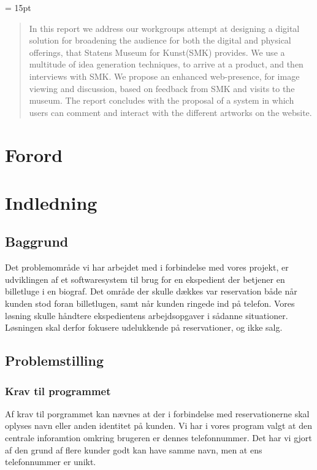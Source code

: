 \documentclass[final]{rapport1}
\begin{document}
\begin{titlepage}

\end{titlepage}






 
\baselineskip= 15pt

\begin{abstract}

In this report we address our workgroups attempt at designing a digital solution for broadening the audience for both the digital and physical offerings, that Statens Museum for Kunst(SMK) provides. We use a multitude of idea generation techniques, to arrive at a product, and then interviews with SMK. We propose an enhanced web-presence, for image viewing and discussion, based on feedback from SMK and visits to the museum. The report concludes with the proposal of a system in which users can comment and interact with the different artworks on the website.

\end{abstract}
\clearpage
\tableofcontents
\chapter{Forord}


\chapter{Indledning}
\section{Baggrund}
Det problemområde vi har arbejdet med i forbindelse med vores projekt, er udviklingen af et softwaresystem til brug for en ekspedient der betjener en billetluge i en biograf. Det område der skulle dækkes var reservation både når kunden stod foran billetlugen, samt når kunden ringede ind på telefon. Vores løsning skulle håndtere   ekspedientens arbejdsopgaver i sådanne situationer. Løsningen skal derfor fokusere udelukkende på reservationer, og ikke salg. 

\section{Problemstilling}

\subsection{Krav til programmet}
Af krav til porgrammet kan nævnes at der i forbindelse med reservationerne skal oplyses navn eller anden identitet på kunden. Vi har i vores program valgt at den centrale inforamtion omkring brugeren er dennes telefonnummer. Det har vi gjort af den grund af flere kunder godt kan have samme navn, men at ens telefonnummer er unikt.  
\end{document}
